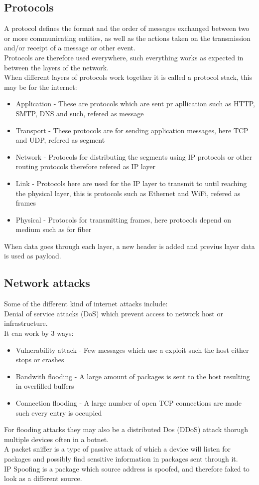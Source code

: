 \documentclass[12pt, a4paper]{article}
\begin{document}
		\subsection{Protocols}
			A protocol defines the format and the order of messages exchanged between two or more communicating entities, as well as the actions taken on the transmission and/or receipt of a message or other event.\\[4mm]
			Protocols are therefore used everywhere, such everything works as expected in between the layers of the network.\\
			When different layers of protocols work together it is called a protocol stack, this may be for the internet: 
			\begin{itemize}
				\item Application - These are protocols which are sent pr apllication such as HTTP, SMTP, DNS and such, refered as message
				\item Transport - These protocols are for sending application messages, here TCP and UDP, refered as segment
				\item Network - Protocols for distributing the segments using IP protocols or other routing protocols therefore refered as IP layer
				\item Link - Protocols here are used for the IP layer to transmit to until reaching the physical layer, this is protocols such as Ethernet and WiFi, refered as frames
				\item Physical - Protocols for transmitting frames, here protocols depend on medium such as for fiber
			\end{itemize}
			When data goes through each layer, a new header is added and previus layer data is used as payload.\\
		\subsection{Network attacks}
			Some of the different kind of internet attacks include:\\
			Denial of service attacks (DoS) which prevent access to network host or infrastructure.\\
			It can work by 3 ways:
			\begin{itemize}
				\item Vulnerability attack - Few messages which use a exploit such the host either stops or crashes
				\item Bandwith flooding - A large amount of packages is sent to the host resulting in overfilled buffers
				\item Connection flooding - A large number of open TCP connections are made such every entry is occupied
			\end{itemize}
			For flooding attacks they may also be a distributed Dos  (DDoS) attack thorugh multiple devices often in a botnet.\\[4mm]
			A packet sniffer is a type of passive attack of which a device will listen for packages and possibly find sensitive information in packages sent through it.\\
			IP Spoofing is a package which source address is spoofed, and therefore faked to look as a different source.\\
\end{document}
